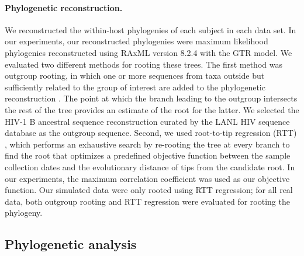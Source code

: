 \documentclass{bmcart}
\begin{document}

\paragraph {Phylogenetic reconstruction.} \label{subsec:phylo}
We reconstructed the within-host phylogenies of each subject in each data set.
In our experiments, our reconstructed phylogenies were maximum likelihood phylogenies reconstructed using RAxML version 8.2.4 \cite{Raxml14} with the GTR model.
We evaluated two different methods for rooting these trees. 
The first method was outgroup rooting, in which one or more sequences from taxa outside but sufficiently related to the group of interest are added to the phylogenetic reconstruction \cite{Huelsenbeck02}.
The point at which the branch leading to the outgroup intersects the rest of the tree provides an estimate of the root for the latter.
We selected the HIV-1 B ancestral sequence reconstruction curated by the LANL HIV sequence database \cite{LosAlamos} as the outgroup sequence.
Second, we used root-to-tip regression (RTT) \cite{Korber00}, which performs an exhaustive search by re-rooting the tree at every branch to find the root that optimizes a predefined objective function between the sample collection dates and the evolutionary distance of tips from the candidate root.
In our experiments, the maximum correlation coefficient was used as our objective function.
Our simulated data were only rooted using RTT regression; for all real data, both outgroup rooting and RTT regression were evaluated for rooting the phylogeny.


\subsection * {Phylogenetic analysis}
\end{document}
